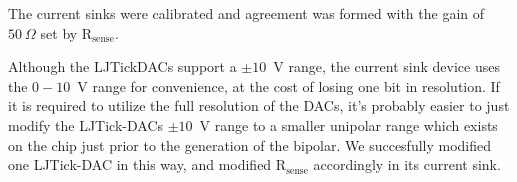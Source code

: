 
The current sinks were calibrated and agreement was formed with the gain of $50~\Omega$ set by $\mathrm{R_{sense}}$.  


Although the LJTickDACs support a $\pm10$~V range, the current sink device uses the $0-10$~V range for convenience, at the cost of losing one bit in resolution. If it is required to utilize the full resolution of the DACs,  it's probably easier to just modify the LJTick-DACs $\pm10$~V range to a smaller unipolar range which exists on the chip just prior to the generation of the bipolar. We succesfully modified one LJTick-DAC in this way, and modified $\mathrm{R_{sense}}$ accordingly in its current sink. 


